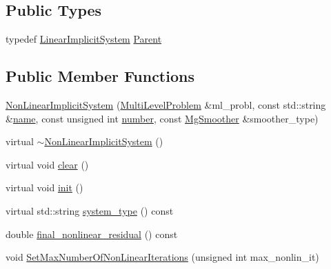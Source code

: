 \subsection*{Public Types}
\begin{DoxyCompactItemize}
\item 
typedef \mbox{\hyperlink{classfemus_1_1_linear_implicit_system}{Linear\+Implicit\+System}} \mbox{\hyperlink{classfemus_1_1_non_linear_implicit_system_a29034444f2d242aa73d041673ec5bc88}{Parent}}
\end{DoxyCompactItemize}
\subsection*{Public Member Functions}
\begin{DoxyCompactItemize}
\item 
\mbox{\hyperlink{classfemus_1_1_non_linear_implicit_system_a1c15ae18c343b00558d1edd018bbffd3}{Non\+Linear\+Implicit\+System}} (\mbox{\hyperlink{classfemus_1_1_multi_level_problem}{Multi\+Level\+Problem}} \&ml\+\_\+probl, const std\+::string \&\mbox{\hyperlink{classfemus_1_1_system_a1a007c176529dae649887bbd1cb46103}{name}}, const unsigned int \mbox{\hyperlink{classfemus_1_1_system_a28f5c7f6286dd597ae28a8923c8dca11}{number}}, const \mbox{\hyperlink{_mg_smoother_enum_8hpp_a4d11c2ff93e2f0f440c879a9c40cda71}{Mg\+Smoother}} \&smoother\+\_\+type)
\item 
virtual \mbox{\hyperlink{classfemus_1_1_non_linear_implicit_system_ac12060f51db75a9bd7866982ec5dd284}{$\sim$\+Non\+Linear\+Implicit\+System}} ()
\item 
virtual void \mbox{\hyperlink{classfemus_1_1_non_linear_implicit_system_afc52f569e5be8c3bf593a00c883d7192}{clear}} ()
\item 
virtual void \mbox{\hyperlink{classfemus_1_1_non_linear_implicit_system_ad2d20975e0c919a9d99bdd9368a0212a}{init}} ()
\item 
virtual std\+::string \mbox{\hyperlink{classfemus_1_1_non_linear_implicit_system_a8f4727b8b763bdac9f58b4c9dbb097be}{system\+\_\+type}} () const
\item 
double \mbox{\hyperlink{classfemus_1_1_non_linear_implicit_system_aaaf3f8e71dcc85553312c1a326d69225}{final\+\_\+nonlinear\+\_\+residual}} () const
\item 
void \mbox{\hyperlink{classfemus_1_1_non_linear_implicit_system_a660090dc6ccd56ed4f04758168099669}{Set\+Max\+Number\+Of\+Non\+Linear\+Iterations}} (unsigned int max\+\_\+nonlin\+\_\+it)
\item 

\end{DoxyCompactItemize}
